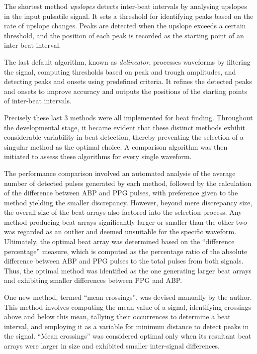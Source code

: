 The shortest method \textit{upslopes} detects inter-beat intervals by analysing upslopes in the input pulsatile signal.
It sets a threshold for identifying peaks based on the rate of upslope changes.
Peaks are detected when the upslope exceeds a certain threshold, and the position of each peak is recorded as the starting point of an inter-beat interval.

The last default algorithm, known as \textit{delineator}, processes waveforms by filtering the signal, computing thresholds based on peak and trough amplitudes,
and detecting peaks and onsets using predefined criteria.
It refines the detected peaks and onsets to improve accuracy and outputs the positions of the starting points of inter-beat intervals.

Precisely these last 3 methods were all implemented for beat finding.
Throughout the developmental stage, it became evident that these distinct methods exhibit considerable variability in beat detection, thereby preventing the selection of a singular method as the optimal choice.
A comparison algorithm was then initiated to assess these algorithms for every single waveform.

The performance comparison involved an automated analysis of the average number of detected pulses generated by each method, followed by the calculation of the difference between ABP and PPG pulses, with preference given to the method yielding the smaller discrepancy.
However, beyond mere discrepancy size, the overall size of the beat arrays also factored into the selection process.
Any method producing beat arrays significantly larger or smaller than the other two was regarded as an outlier and deemed unsuitable for the specific waveform.
Ultimately, the optimal beat array was determined based on the \enquote{difference percentage} measure, which is computed as the percentage ratio of the absolute difference between ABP and PPG pulses to the total pulses from both signals.
Thus, the optimal method was identified as the one generating larger beat arrays and exhibiting smaller differences between PPG and ABP\@.

One new method, termed \enquote{mean crossings}, was devised manually by the author.
This method involves computing the mean value of a signal, identifying crossings above and below this mean,
tallying their occurrences to determine a beat interval, and employing it as a variable for minimum distance to detect peaks in the signal.
\enquote{Mean crossings} was considered optimal only when its resultant beat arrays were larger in size and exhibited smaller inter-signal differences.

